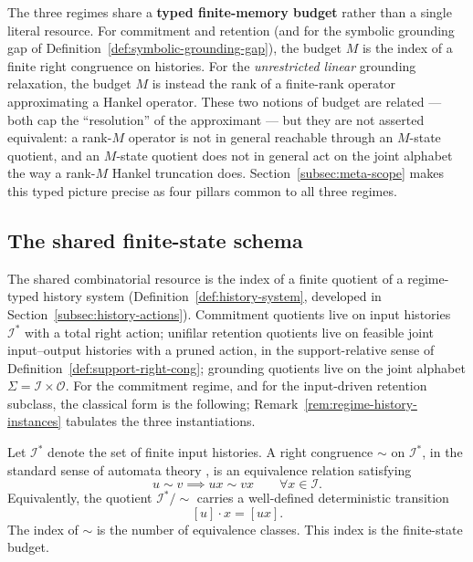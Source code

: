 \documentclass[12pt]{article}
\theoremstyle{definition}
\begin{document}
The three regimes share a \textbf{typed finite-memory budget} rather than a
single literal resource.  For commitment and retention (and for the symbolic
grounding gap of Definition~\ref{def:symbolic-grounding-gap}), the budget $M$
is the index of a finite right congruence on histories.  For the
\emph{unrestricted linear} grounding relaxation, the budget $M$ is instead the
rank of a finite-rank operator approximating a Hankel operator.  These two
notions of budget are related --- both cap the ``resolution'' of the
approximant --- but they are not asserted equivalent: a rank-$M$ operator is
not in general reachable through an $M$-state quotient, and an $M$-state
quotient does not in general act on the joint alphabet the way a rank-$M$
Hankel truncation does.  Section~\ref{subsec:meta-scope} makes this typed
picture precise as four pillars common to all three regimes.

\subsection{The shared finite-state schema}
\label{subsec:shared-schema-intro}

The shared combinatorial resource is the index of a finite quotient of a
regime-typed history system (Definition~\ref{def:history-system}, developed in
Section~\ref{subsec:history-actions}).
Commitment quotients live on input histories $\mathcal I^*$ with a total right
action; unifilar retention quotients live on feasible joint input--output
histories with a pruned action, in the support-relative sense of
Definition~\ref{def:support-right-cong}; grounding quotients live on the joint
alphabet $\Sigma=\mathcal I\times\mathcal O$.  For the commitment regime, and
for the input-driven retention subclass, the classical form is the following;
Remark~\ref{rem:regime-history-instances} tabulates the three instantiations.

Let $\mathcal I^*$ denote the set of finite input histories.  A right
congruence $\sim$ on $\mathcal I^*$, in the standard sense of automata theory
\cite{sakarovitch2009}, is an equivalence relation satisfying
\[
u\sim v
\implies
ux\sim vx
\qquad
\forall x\in\mathcal I.
\]
Equivalently, the quotient $\mathcal I^*/\!\sim$ carries a well-defined
deterministic transition
\[
[u]\cdot x=[ux].
\]
The index of $\sim$ is the number of equivalence classes.  This index is the
finite-state budget.
\end{document}
